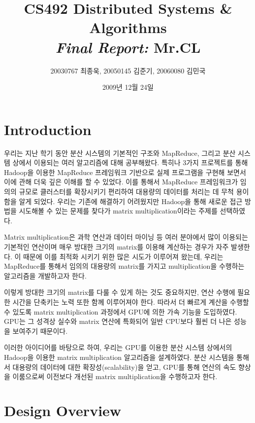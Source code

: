 \documentclass[a4paper]{article}
\begin{document}
\title{CS492 Distributed Systems \& Algorithms\\ \textit{Final Report:} \textbf{Mr.CL}}
\author{20030767 최종욱, 20050145 김준기, 20060080 김민국}
\date{2009년 12월 24일}
\vspace{-40pt}
\maketitle

\begin{multicols}{2}
\section{Introduction}
우리는 지난 학기 동안 분산 시스템의 기본적인 구조와 MapReduce, 그리고 분산 시스템 상에서 이용되는 여러 알고리즘에 대해 공부해왔다.
특히나 3가지 프로젝트를 통해 Hadoop을 이용한 MapReduce 프레임워크 기반으로 실제 프로그램을 구현해 보면서 이에 관해 더욱 깊은 이해를 할 수 있었다.
이를 통해서 MapReduce 프레임워크가 임의의 규모로 클러스터를 확장시키기 편리하여 대용량의 데이터를 처리는 데 무척 용이함을 알게 되었다.
우리는 기존에 해결하기 어려웠지만 Hadoop을 통해 새로운 접근 방법을 시도해볼 수 있는 문제를 찾다가 matrix multiplication이라는 주제를 선택하였다.

Matrix multiplication은 과학 연산과 데이터 마이닝 등 여러 분야에서 많이 이용되는 기본적인 연산이며 매우 방대한 크기의 matrix를 이용해 계산하는 경우가 자주 발생한다.
이 때문에 이를 최적화 시키기 위한 많은 시도가 이루어져 왔는데, 우리는 MapReduce를 통해서 임의의 대용량의 matrix를 가지고 multiplication을 수행하는 알고리즘을 개발하고자 한다.

이렇게 방대한 크기의 matrix를 다룰 수 있게 하는 것도 중요하지만, 연산 수행에 필요한 시간을 단축키는 노력 또한 함께 이루어져야 한다.
따라서 더 빠르게 계산을 수행할 수 있도록 matrix multiplication 과정에서 GPU에 의한 가속 기능을 도입하였다.
GPU는 그 성격상 실수와 matrix 연산에 특화되어 일반 CPU보다 훨씬 더 나은 성능을 보여주기 때문이다.

이러한 아이디어를 바탕으로 하여, 우리는 GPU를 이용한 분산 시스템 상에서의 Hadoop을 이용한 matrix multiplication 알고리즘을 설계하였다.
분산 시스템을 통해서 대용량의 데이터에 대한 확장성(scalability)을 얻고, GPU를 통해 연산의 속도 향상을 이룸으로써 이전보다 개선된 matrix multiplication을 수행하고자 한다. 

\section{Design Overview}

\end{multicols}
\end{document}

